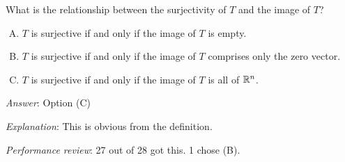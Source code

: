 \documentclass[10pt]{amsart}
\begin{document}
\begin{enumerate}
  What is the relationship between the surjectivity of $T$ and the
  image of $T$?

  \begin{enumerate}[(A)]
  \item $T$ is surjective if and only if the image of $T$ is empty.
  \item $T$ is surjective if and only if the image of $T$ comprises
    only the zero vector.
  \item $T$ is surjective if and only if the image of $T$ is all of
    $\mathbb{R}^n$.
  \end{enumerate}

  {\em Answer}: Option (C)

  {\em Explanation}: This is obvious from the definition.

  {\em Performance review}: 27 out of 28 got this. 1 chose (B).
\end{enumerate}
\end{document}
